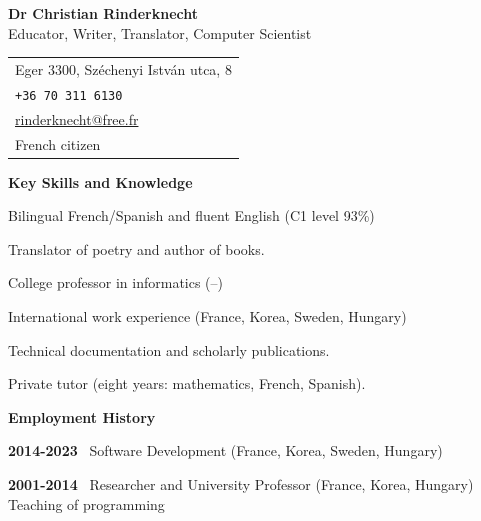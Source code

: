 \documentclass[a4paper,11pt]{article}
\begin{document}
\begin{center}
\textbf{\LARGE Dr Christian Rinderknecht}\\[5mm]
       {\large Educator, Writer, Translator, Computer Scientist}
\end{center}

\bigskip

\noindent
\begin{tabular}{@{}l@{}}
  Eger 3300, Széchenyi István utca, 8 \\
 \texttt{+36 70 311 6130} \\
 \url{rinderknecht@free.fr} \\
 French citizen
\end{tabular}

\bigskip


\pagestyle{empty}

\bigskip
\bigskip

\noindent\textbf{\large Key Skills and Knowledge}
\begin{itemize*}

  \item Bilingual French/Spanish and fluent English (C1 level 93\%)

  \item Translator of poetry and author of books.

  \item College professor in informatics
    (--)

  \item International work experience (France, Korea, Sweden, Hungary)

  \item Technical documentation and scholarly publications.

  \item Private tutor (eight years: mathematics, French, Spanish).

\end{itemize*}

\bigskip
\noindent\textbf{\large Employment History}
\bigskip

\noindent\textbf{2014-2023} \ \textsf{Software Development} (France,
Korea, Sweden, Hungary)

\bigskip

\noindent\textbf{2001-2014} \ \textsf{Researcher and University
  Professor} (France, Korea, Hungary)\\ Teaching of programming
\end{document}
